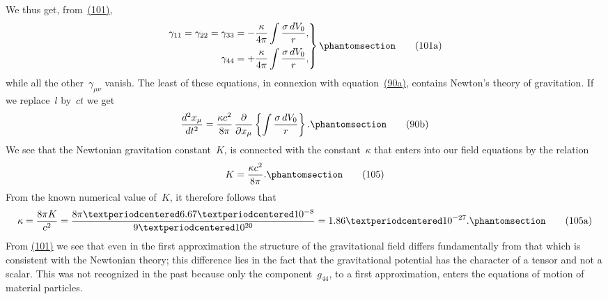 \documentclass[12pt]{book}[2005/09/16]
\newcommand{\Change}[2]{#2}
\newcommand{\Add}[1]{\Change{}{#1}}
\newcommand{\PageSep}[1]{\ignorespaces}
\newcommand{\Tag}[1]{%
  \phantomsection
  \label{eqn:#1}
  \tag*{#1}
}
\newcommand{\Eqref}[1]{\hyperref[eqn:#1]{#1}}
\newcommand{\dd}{\partial}
\begin{document}
We thus get, from~\Eqref{(101)},
\[
\left.
\begin{aligned}
\gamma_{11} = \gamma_{22} = \gamma_{33}
  &= -\frac{\kappa}{4\pi} \int \frac{\sigma\, dV_{0}}{r}\Add{,} \\
\gamma_{44} &= +\frac{\kappa}{4\pi} \int \frac{\sigma\, dV_{0}}{r}\Add{,}
\end{aligned}
\right\}
\Tag{(101a)}
\]
while all the other~$\gamma_{\mu\nu}$ vanish. The least of these equations,
in connexion with equation~\Eqref{(90a)}, contains Newton's
theory of gravitation. If we replace~$l$ by~$ct$ we
get
\[
\frac{d^{2} x_{\mu}}{dt^{2}}
  = \frac{\kappa c^{2}}{8\pi}\, \frac{\dd}{\dd x_{\mu}} \left\{
    \int \frac{\sigma\, dV_{0}}{r}
  \right\}\Add{.}
\Tag{(90b)}
\]
We see that the Newtonian gravitation constant~$K$, is
%
%
connected with the constant~$\kappa$ that enters into our field
equations by the relation
\[
K = \frac{\kappa c^{2}}{8\pi}\Add{.}
\Tag{(105)}
\]
\PageSep{99}
From the known numerical value of~$K$, it therefore
follows that
\[
\kappa = \frac{8\pi K}{c^{2}}
  = \frac{8\pi·6.67·10^{-8}}{9·10^{20}}
  = 1.86·10^{-27}\Add{.}
\Tag{(105a)}
\]
From \Eqref{(101)} we see that even in the first approximation
the structure of the gravitational field differs fundamentally
from that which is consistent with the Newtonian theory;
this difference lies in the fact that the gravitational
potential has the character of a tensor and not a scalar.
This was not recognized in the past because only the
component~$g_{44}$, to a first approximation, enters the equations
of motion of material particles.
\end{document}

